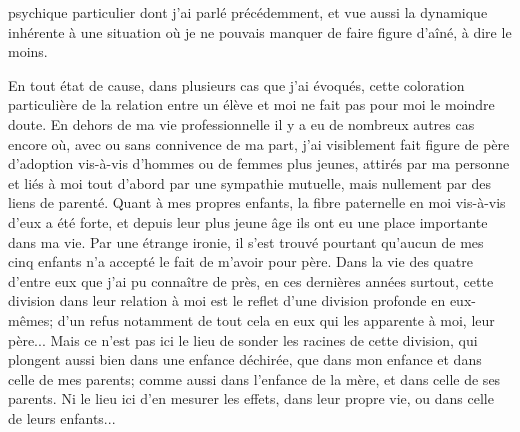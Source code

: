 psychique particulier dont j'ai parlé précédemment, et vue aussi la dynamique inhérente à une situation où je ne pouvais manquer de faire figure d'aîné, à dire le moins.

En tout état de cause, dans plusieurs cas que j'ai évoqués, cette coloration particulière de la relation entre un élève et moi ne fait pas pour moi le moindre doute. En dehors de ma vie professionnelle il y a eu de nombreux autres cas encore où, avec ou sans connivence de ma part, j'ai visiblement fait figure de père d'adoption vis-à-vis d'hommes ou de femmes plus jeunes, attirés par ma personne et liés à moi tout d'abord par une sympathie mutuelle, mais nullement par des liens de parenté. Quant à mes propres enfants, la fibre paternelle en moi vis-à-vis d'eux a été forte, et depuis leur plus jeune âge ils ont eu une place importante dans ma vie. Par une étrange ironie, il s'est trouvé pourtant qu'aucun de mes cinq enfants n'a accepté le fait de m'avoir pour père. Dans la vie des quatre d'entre eux que j'ai pu connaître de près, en ces dernières années surtout, cette division dans leur relation à moi est le reflet d'une division profonde en eux-mêmes; d'un refus notamment de tout cela en eux qui les apparente à moi, leur père... Mais ce n'est pas ici le lieu de sonder les racines de cette division, qui plongent aussi bien dans une enfance déchirée, que dans mon enfance et dans celle de mes parents; comme aussi dans l'enfance de la mère, et dans celle de ses parents. Ni le lieu ici d'en mesurer les effets, dans leur propre vie, ou dans celle de leurs enfants...
